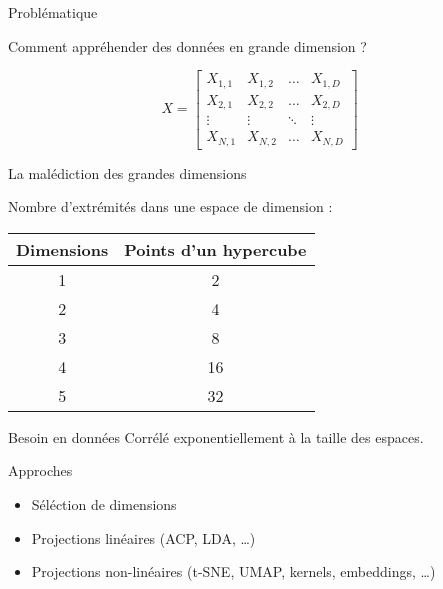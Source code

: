 \begin{frame}{Problématique}
    \begin{center}
      Comment appréhender des données en grande dimension ?
    \end{center}
    \[
    X = \begin{bmatrix}
      X_{1,1} & X_{1,2} & \dots  & X_{1,D} \\
      X_{2,1} & X_{2,2} & \dots  & X_{2,D} \\
      \vdots & \vdots & \ddots & \vdots \\
      X_{N,1} & X_{N,2} & \dots  & X_{N,D}
    \end{bmatrix}
    \]
\end{frame}

\begin{frame}{La malédiction des grandes dimensions}
    \begin{center}
      Nombre d'extrémités dans une espace de dimension : \\
      $\;$ \\
      \begin{tabular}{cc}
        Dimensions & Points d'un hypercube \\
        \midrule
        1 & 2 \\
        2 & 4 \\
        3 & 8 \\
        4 & 16 \\
        5 & 32 \\
      \end{tabular}
    \end{center}

  \begin{alertblock}{Besoin en données}
    Corrélé exponentiellement à la taille des espaces.
  \end{alertblock}
\end{frame}

\begin{frame}{Approches}
    \begin{itemize}
    \item Séléction de dimensions
    \item Projections linéaires (ACP, LDA, …)
    \item Projections non-linéaires (t-SNE, UMAP, kernels, embeddings, …)
    \end{itemize}
\end{frame}
